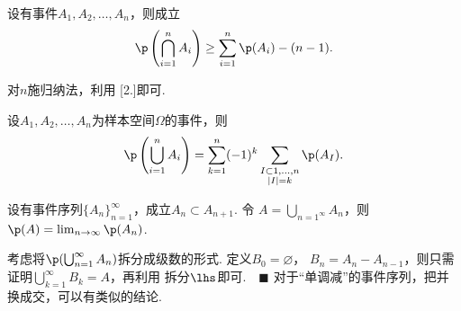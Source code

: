   \begin{lemma}[Bonferroni不等式]
    设有事件$A_1, A_2, \dots, A_n$，则成立
    \[
      \p\left(\bigcap_{i=1}^n A_i\right) \ge \sum_{i=1}^n\p(A_i) - (n-1).
    \]
  \end{lemma}
  \proof
    对$n$施归纳法，利用 [2.]即可.

  \begin{thm}[容斥原理]
    设$A_1,A_2,\dots, A_n$为样本空间$\Omega$的事件，则
    \[
      \p\left( \bigcup_{i=1}^n A_i \right) =
      \sum_{k=1}^n (-1)^k
      \sum_{\substack{I\subset{1,\dots,n}\\|I|=k}}\p(A_I).
    \]
  \end{thm}

  \begin{thm}[连续概率]
    设有事件序列$\{A_n\}_{n=1}^\infty$，成立$A_n\subset A_{n+1}$. 令
    $A=\bigcup_{n=1^\infty}A_n$，则$\p(A)=\lim_{n\to\infty}\p(A_n)$.
  \end{thm}
  \proof
    考虑将$\p(\bigcup_{n=1}^\infty A_n)$拆分成级数的形式. 定义$B_0=\varnothing$，
    $B_n = A_n - A_{n-1}$，则只需证明$\bigcup_{k=1}^\infty B_k = A$，再利用
    拆分$\lhs$即可.$\quad\blacksquare$
  \remark
    对于“单调减”的事件序列，把并换成交，可以有类似的结论.


